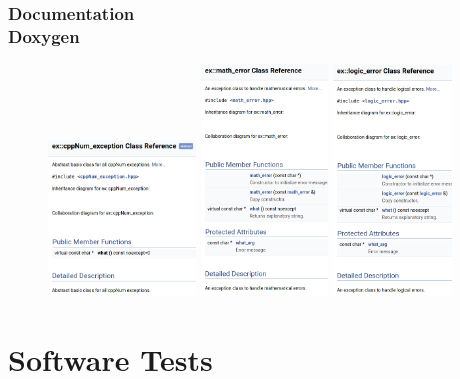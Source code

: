 \documentclass[ucs,10pt]{beamer}
\begin{document}
\begin{frame}
\frametitle{Documentation \\
        \small \color{rwth-blue} Doxygen}
	\begin{figure}[b]
		\includegraphics[width=0.35\textwidth]{figures/cppNum_exception_doc.png}
                \includegraphics[width=0.3\textwidth]{figures/math_error_doc.png}
                \includegraphics[width=0.28\textwidth]{figures/logic_error_doc.png}
        \end{figure}
\end{frame}

\section{Software Tests}
\end{document}
